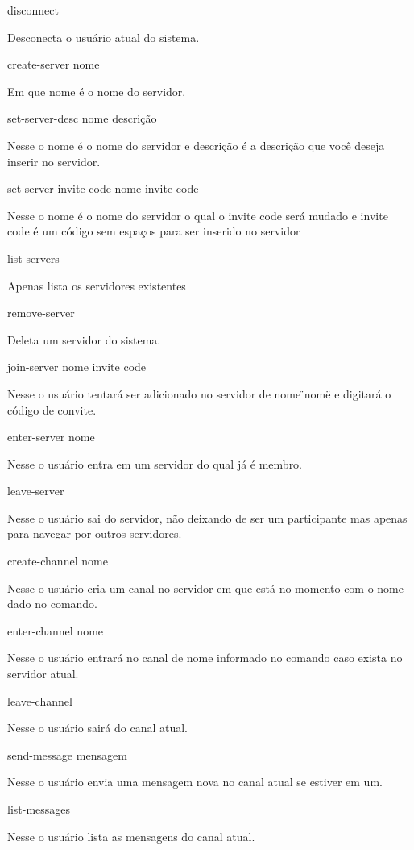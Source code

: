 \begin{DoxyItemize}
\item disconnect

Desconecta o usuário atual do sistema.
\item create-\/server nome

Em que nome é o nome do servidor.
\item set-\/server-\/desc nome descrição

Nesse o nome é o nome do servidor e descrição é a descrição que você deseja inserir no servidor.
\item set-\/server-\/invite-\/code nome invite-\/code

Nesse o nome é o nome do servidor o qual o invite code será mudado e invite code é um código sem espaços para ser inserido no servidor
\item list-\/servers

Apenas lista os servidores existentes
\item remove-\/server

Deleta um servidor do sistema.
\item join-\/server nome invite code

Nesse o usuário tentará ser adicionado no servidor de nome \"{}nome\"{} e digitará o código de convite.
\item enter-\/server nome

Nesse o usuário entra em um servidor do qual já é membro.
\item leave-\/server

Nesse o usuário sai do servidor, não deixando de ser um participante mas apenas para navegar por outros servidores.
\item create-\/channel nome

Nesse o usuário cria um canal no servidor em que está no momento com o nome dado no comando.
\item enter-\/channel nome

Nesse o usuário entrará no canal de nome informado no comando caso exista no servidor atual.
\item leave-\/channel

Nesse o usuário sairá do canal atual.
\item send-\/message mensagem

Nesse o usuário envia uma mensagem nova no canal atual se estiver em um.
\item list-\/messages

Nesse o usuário lista as mensagens do canal atual. 
\end{DoxyItemize}